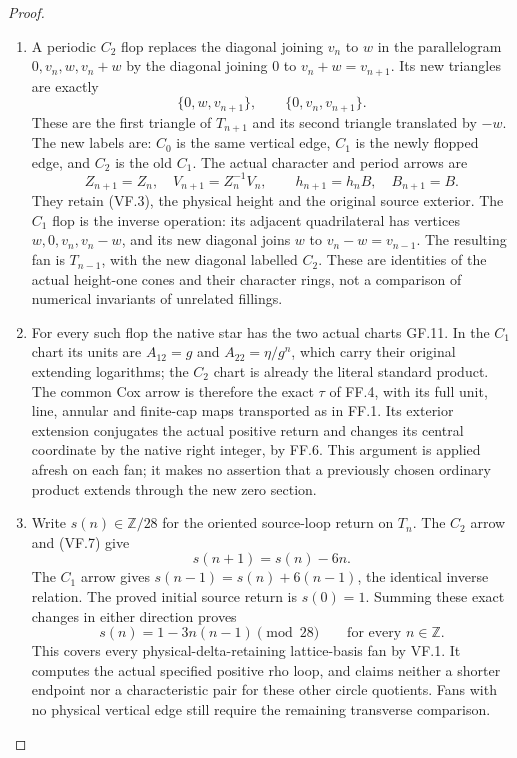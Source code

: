 \begin{proof}
\begin{enumerate}[label=\arabic*.]
\item A periodic \(C_2\) flop replaces the diagonal joining \(v_n\) to
\(w\) in the parallelogram \(0,v_n,w,v_n+w\) by the diagonal
joining \(0\) to \(v_n+w=v_{n+1}\). Its new triangles are exactly
\[
 \{0,w,v_{n+1}\},\qquad\{0,v_n,v_{n+1}\}.
\]
These are the first triangle of \(T_{n+1}\) and its second triangle
translated by \(-w\). The new labels are: \(C_0\) is the same
vertical edge, \(C_1\) is the newly flopped edge, and \(C_2\) is
the old \(C_1\). The actual character and period arrows are
\[
 Z_{n+1}=Z_n,\quad V_{n+1}=Z_n^{-1}V_n,\qquad
 h_{n+1}=h_nB,\quad B_{n+1}=B.                        \tag{VF.8}
\]
They retain (VF.3), the physical height and the original source
exterior. The \(C_1\) flop is the inverse operation: its adjacent
quadrilateral has vertices \(w,0,v_n,v_n-w\), and its new diagonal
joins \(w\) to \(v_n-w=v_{n-1}\). The resulting fan is \(T_{n-1}\),
with the new diagonal labelled \(C_2\). These are identities of the
actual height-one cones and their character rings, not a comparison
of numerical invariants of unrelated fillings.

\item For every such flop the native star has the two actual charts
GF.11. In the \(C_1\) chart its units are \(A_{12}=g\) and
\(A_{22}=\eta/g^n\), which carry their original extending logarithms;
the \(C_2\) chart is already the literal standard product. The
common Cox arrow is therefore the exact \(\tau\) of FF.4, with
its full unit, line, annular and finite-cap maps transported as in
FF.1. Its exterior extension conjugates the actual positive return
and changes its central coordinate by the native right integer,
by FF.6. This argument is applied afresh on each fan; it makes no
assertion that a previously chosen ordinary product extends through
the new zero section.

\item Write \(s(n)\in\mathbb Z/28\) for the oriented source-loop return
on \(T_n\). The \(C_2\) arrow and (VF.7) give
\[
                     s(n+1)=s(n)-6n.                 \tag{VF.9}
\]
The \(C_1\) arrow gives \(s(n-1)=s(n)+6(n-1)\), the identical
inverse relation. The proved initial source return is \(s(0)=1\).
Summing these exact changes in either direction proves
\[
                    s(n)=1-3n(n-1)\pmod{28}
                    \qquad\text{for every }n\in\mathbb Z.
                                                               \tag{VF.10}
\]
This covers every physical-delta-retaining lattice-basis fan by
VF.1. It computes the actual specified positive rho loop, and
claims neither a shorter endpoint nor a characteristic pair for
these other circle quotients. Fans with no physical vertical edge
still require the remaining transverse comparison.


\end{enumerate}
\end{proof}
